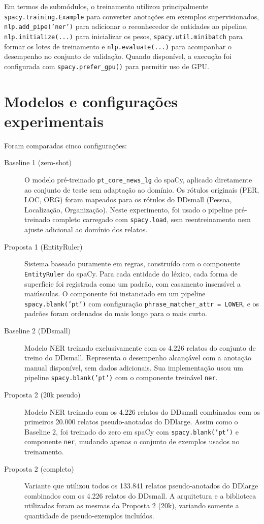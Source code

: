 \documentclass[12pt,a4paper]{article}
\begin{document}
Em termos de submódulos, o treinamento utilizou principalmente
\texttt{spacy.training.Example} para converter anotações em exemplos
supervisionados, \texttt{nlp.add\_pipe('ner')} para adicionar o reconhecedor de
entidades ao pipeline, \texttt{nlp.initialize(...)} para inicializar os pesos,
\texttt{spacy.util.minibatch} para formar os lotes de treinamento e
\texttt{nlp.evaluate(...)} para acompanhar o desempenho no conjunto de
validação. Quando disponível, a execução foi configurada com
\texttt{spacy.prefer\_gpu()} para permitir uso de GPU.

\section{Modelos e configurações experimentais}

Foram comparadas cinco configurações:

\begin{description}
  \item[Baseline 1 (zero-shot)] O modelo pré-treinado \texttt{pt\_core\_news\_lg}
    do spaCy, aplicado diretamente ao conjunto de teste sem adaptação ao domínio.
    Os rótulos originais (PER, LOC, ORG) foram mapeados para os rótulos do
    DDsmall (Pessoa, Localização, Organização). Neste experimento, foi usado o
    pipeline pré-treinado completo carregado com \texttt{spacy.load}, sem
    reentreinamento nem ajuste adicional ao domínio dos relatos.

  \item[Proposta 1 (EntityRuler)] Sistema baseado puramente em regras, construído
    com o componente \texttt{EntityRuler} do spaCy. Para cada entidade do léxico,
    cada forma de superfície foi registrada como um padrão, com casamento
    insensível a maiúsculas. O componente foi instanciado em um pipeline
    \texttt{spacy.blank('pt')} com configuração \texttt{phrase\_matcher\_attr = LOWER},
    e os padrões foram ordenados do mais longo para o mais curto.

  \item[Baseline 2 (DDsmall)] Modelo NER treinado exclusivamente com os 4.226
    relatos do conjunto de treino do DDsmall. Representa o desempenho alcançável
    com a anotação manual disponível, sem dados adicionais. Sua implementação
    usou um pipeline \texttt{spacy.blank('pt')} com o componente treinável
    \texttt{ner}.

  \item[Proposta 2 (20k pseudo)] Modelo NER treinado com os 4.226 relatos do
    DDsmall combinados com os primeiros 20.000 relatos pseudo-anotados do DDlarge.
    Assim como o Baseline 2, foi treinado do zero em spaCy com
    \texttt{spacy.blank('pt')} e componente \texttt{ner}, mudando apenas o
    conjunto de exemplos usados no treinamento.

  \item[Proposta 2 (completo)] Variante que utilizou todos os 133.841 relatos
    pseudo-anotados do DDlarge combinados com os 4.226 relatos do DDsmall.
    A arquitetura e a biblioteca utilizadas foram as mesmas da Proposta 2 (20k),
    variando somente a quantidade de pseudo-exemplos incluídos.
\end{description}
\end{document}
